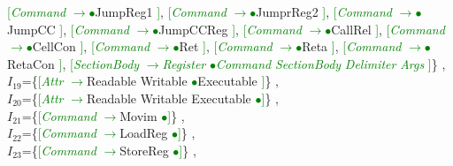 \documentclass[a0]{a0poster}
\begin{document}
\textcolor{Green}{[}\textcolor{Green}{\textit{Command}} \textcolor{Green}{$\to$}\textcolor{Green}{$\bullet$}JumpReg1 \textcolor{Green}{]}, \textcolor{Green}{[}\textcolor{Green}{\textit{Command}} \textcolor{Green}{$\to$}\textcolor{Green}{$\bullet$}JumprReg2 \textcolor{Green}{]}, \textcolor{Green}{[}\textcolor{Green}{\textit{Command}} \textcolor{Green}{$\to$}\textcolor{Green}{$\bullet$}JumpCC \textcolor{Green}{]}, \textcolor{Green}{[}\textcolor{Green}{\textit{Command}} \textcolor{Green}{$\to$}\textcolor{Green}{$\bullet$}JumpCCReg \textcolor{Green}{]}, \textcolor{Green}{[}\textcolor{Green}{\textit{Command}} \textcolor{Green}{$\to$}\textcolor{Green}{$\bullet$}CallRel \textcolor{Green}{]}, \textcolor{Green}{[}\textcolor{Green}{\textit{Command}} \textcolor{Green}{$\to$}\textcolor{Green}{$\bullet$}CellCon \textcolor{Green}{]}, \textcolor{Green}{[}\textcolor{Green}{\textit{Command}} \textcolor{Green}{$\to$}\textcolor{Green}{$\bullet$}Ret \textcolor{Green}{]}, \textcolor{Green}{[}\textcolor{Green}{\textit{Command}} \textcolor{Green}{$\to$}\textcolor{Green}{$\bullet$}Reta \textcolor{Green}{]}, \textcolor{Green}{[}\textcolor{Green}{\textit{Command}} \textcolor{Green}{$\to$}\textcolor{Green}{$\bullet$}RetaCon \textcolor{Green}{]}, \textcolor{Green}{[}\textcolor{Green}{\textit{SectionBody}} \textcolor{Green}{$\to$}\textcolor{Green}{\textit{Register}} \textcolor{Green}{$\bullet$}\textcolor{Green}{\textit{Command}} \textcolor{Green}{\textit{SectionBody}} \textcolor{Green}{\textit{Delimiter}} \textcolor{Green}{\textit{Args}} \textcolor{Green}{]}\}
,\\
$I_{19}$=\{\textcolor{Green}{[}\textcolor{Green}{\textit{Attr}} \textcolor{Green}{$\to$}Readable Writable \textcolor{Green}{$\bullet$}Executable \textcolor{Green}{]}\}
,\\
$I_{20}$=\{\textcolor{Green}{[}\textcolor{Green}{\textit{Attr}} \textcolor{Green}{$\to$}Readable Writable Executable \textcolor{Green}{$\bullet$}\textcolor{Green}{]}\}
,\\
$I_{21}$=\{\textcolor{Green}{[}\textcolor{Green}{\textit{Command}} \textcolor{Green}{$\to$}Movim \textcolor{Green}{$\bullet$}\textcolor{Green}{]}\}
,\\
$I_{22}$=\{\textcolor{Green}{[}\textcolor{Green}{\textit{Command}} \textcolor{Green}{$\to$}LoadReg \textcolor{Green}{$\bullet$}\textcolor{Green}{]}\}
,\\
$I_{23}$=\{\textcolor{Green}{[}\textcolor{Green}{\textit{Command}} \textcolor{Green}{$\to$}StoreReg \textcolor{Green}{$\bullet$}\textcolor{Green}{]}\}
,\\
\end{document}

